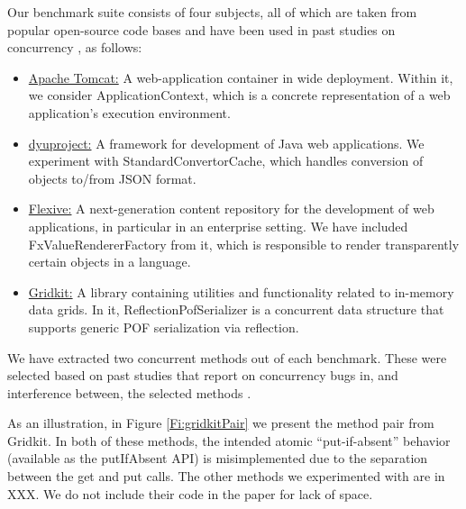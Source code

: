 Our benchmark suite consists of four subjects, all of which are taken from popular open-source code bases and have been used in past studies on concurrency \cite{oopsla/ShachamBASVY11,issta/ShachamYGABSV14}, as follows:
\begin{itemize}
	\item \underline{Apache Tomcat:} A web-application container in wide deployment. Within it, we consider {\sf ApplicationContext}, which is a concrete representation of a web application's execution environment.
	\item \underline{dyuproject:} A framework for development of Java web applications. We experiment with {\sf StandardConvertorCache}, which handles conversion of objects to/from JSON format.
	\item \underline{Flexive:} A next-generation content repository for the development of web applications, in particular in an enterprise setting. We have included {\sf FxValueRendererFactory} from it, which is responsible to render transparently certain objects in a language.
	\item \underline{Gridkit:} A library containing utilities and functionality related to in-memory data grids. In it, {\sf ReflectionPofSerializer} is a concurrent data structure that supports generic POF serialization via reflection.
\end{itemize}

We have extracted two concurrent methods out of each benchmark. These were selected based on past studies that report on concurrency bugs in, and interference between, the selected methods \cite{oopsla/ShachamBASVY11}. 

As an illustration, in Figure \ref{Fi:gridkitPair} we present the method pair from Gridkit. In both of these methods, the intended atomic ``put-if-absent'' behavior (available as the {\sf putIfAbsent} API) is misimplemented due to the separation between the {\sf get} and {\sf put} calls. The other methods we experimented with are in XXX. We do not include their code in the paper for lack of space.

